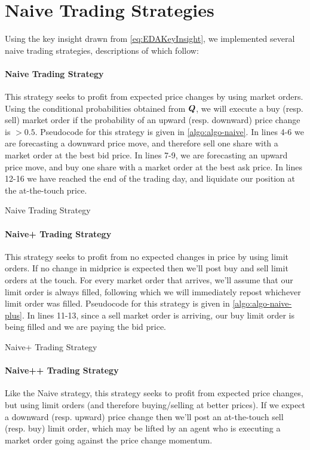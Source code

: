\section{Naive Trading Strategies}
Using the key insight drawn from \eqref{eq:EDAKeyInsight}, we implemented several naive trading strategies, descriptions of which follow:

\paragraph{Naive Trading Strategy}  This strategy seeks to profit from expected price changes by using market orders. Using the conditional probabilities obtained from $\boldsymbol{Q}$, we will execute a buy (resp. sell) market order if the probability of an upward (resp. downward) price change is $> 0.5$. Pseudocode for this strategy is given in \autoref{algo:algo-naive}. In lines 4-6 we are forecasting a downward price move, and therefore sell one share with a market order at the best bid price. In lines 7-9, we are forecasting an upward price move, and buy one share with a market order at the best ask price. In lines 12-16 we have reached the end of the trading day, and liquidate our position at the at-the-touch price.
\begin{algorithm}
	\caption{Naive Trading Strategy}
	
	\label{algo:algo-naive}
\end{algorithm}

\clearpage
\paragraph{Naive+ Trading Strategy} This strategy seeks to profit from no expected changes in price by using limit orders. If no change in midprice is expected then we'll post buy and sell limit orders at the touch. For every market order that arrives, we'll assume that our limit order is always filled, following which we will immediately repost whichever limit order was filled. Pseudocode for this strategy is given in \autoref{algo:algo-naive-plus}. In lines 11-13, since a sell market order is arriving, our buy limit order is being filled and we are paying the bid price. 
\begin{algorithm}
	\caption{Naive+ Trading Strategy}
	
	\label{algo:algo-naive-plus}
\end{algorithm}

\paragraph{Naive++ Trading Strategy} Like the Naive strategy, this strategy seeks to profit from expected price changes, but using limit orders (and therefore buying/selling at better prices). If we expect a downward (resp. upward) price change then we'll post an at-the-touch sell (resp. buy) limit order, which may be lifted by an agent who is executing a market order going against the price change momentum. 

